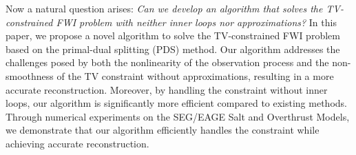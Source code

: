 Now a natural question arises: \textit{Can we develop an algorithm that solves the TV-constrained FWI problem with neither inner loops nor approximations?}
In this paper, we propose a novel algorithm to solve the TV-constrained FWI problem based on the primal-dual splitting (PDS) method.
Our algorithm addresses the challenges posed by both the nonlinearity of the observation process and the non-smoothness of the TV constraint without approximations, resulting in a more accurate reconstruction.
Moreover, by handling the constraint without inner loops, our algorithm is significantly more efficient compared to existing methods.
Through numerical experiments on the SEG/EAGE Salt and Overthrust Models, we demonstrate that our algorithm efficiently handles the constraint while achieving accurate reconstruction.
